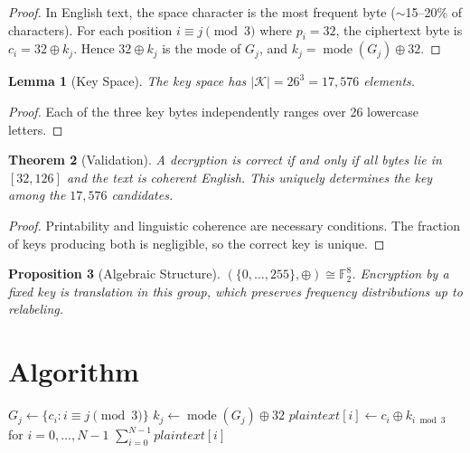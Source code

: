 \documentclass[12pt,a4paper]{article}
\newtheorem{theorem}{Theorem}
\newtheorem{lemma}[theorem]{Lemma}
\newtheorem{proposition}[theorem]{Proposition}
\theoremstyle{definition}
\theoremstyle{remark}
\begin{document}
\begin{proof}
In English text, the space character is the most frequent byte ($\sim$15--20\% of characters). For each position $i \equiv j \pmod{3}$ where $p_i = 32$, the ciphertext byte is $c_i = 32 \oplus k_j$. Hence $32 \oplus k_j$ is the mode of $G_j$, and $k_j = \operatorname{mode}(G_j) \oplus 32$.
\end{proof}

\begin{lemma}[Key Space]
The key space has $|\mathcal{K}| = 26^3 = 17{,}576$ elements.
\end{lemma}

\begin{proof}
Each of the three key bytes independently ranges over 26 lowercase letters.
\end{proof}

\begin{theorem}[Validation]
A decryption is correct if and only if all bytes lie in $[32, 126]$ and the text is coherent English. This uniquely determines the key among the $17{,}576$ candidates.
\end{theorem}

\begin{proof}
Printability and linguistic coherence are necessary conditions. The fraction of keys producing both is negligible, so the correct key is unique.
\end{proof}

\begin{proposition}[Algebraic Structure]
$(\{0,\ldots,255\}, \oplus) \cong \mathbb{F}_2^8$. Encryption by a fixed key is translation in this group, which preserves frequency distributions up to relabeling.
\end{proposition}

\section{Algorithm}

\begin{algorithm}[H]
\caption{XOR Decryption via Frequency Analysis}
\begin{algorithmic}[1]
    \State $G_j \gets \{c_i : i \equiv j \pmod{3}\}$
    \State $k_j \gets \operatorname{mode}(G_j) \oplus 32$
\EndFor
\State $\textit{plaintext}[i] \gets c_i \oplus k_{i \bmod 3}$ for $i = 0, \ldots, N-1$
\State \Return $\sum_{i=0}^{N-1} \textit{plaintext}[i]$
\end{algorithmic}
\end{algorithm}
\end{document}
